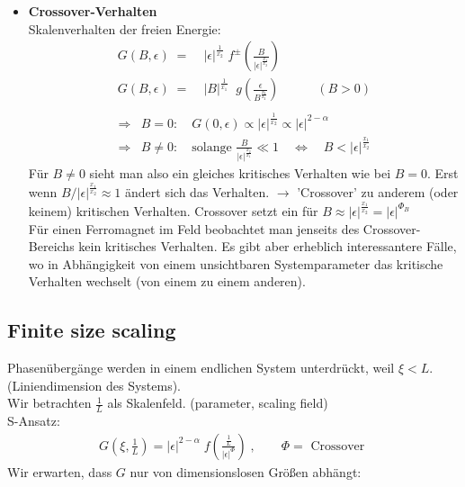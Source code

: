 \documentclass[12pt]{article}
\begin{document}
\begin{itemize}
\item \textbf{Crossover-Verhalten} \\
Skalenverhalten der freien Energie:
\begin{align}
G(B,\epsilon) \; =& \;  \vert \epsilon \vert ^\frac{1}{x_2} \; f^\pm \left( \frac{B}{\vert \epsilon \vert ^\frac{x_1}{x_2}} \right) \\
G(B,\epsilon) \; =  & \; \vert B \vert ^\frac{1}{x_1}\;  \; g \left( \frac{\epsilon}{B ^\frac{x_2}{x_2}} \right) \quad \quad \quad (B>0) \\
\end{align}
\begin{align}
\Rightarrow & B=0: \quad  G(0,\epsilon) \propto \vert \epsilon \vert ^\frac{1}{x_2} \propto \vert \epsilon \vert^{2- \alpha} \\
\Rightarrow & B \neq 0: \quad \mbox{solange } \frac{B}{\vert \epsilon \vert ^\frac{x_2}{x_1}} \ll 1 \quad \Leftrightarrow \quad B< \vert \epsilon \vert ^\frac{x_1}{x_2} \end{align}
Für $B\neq 0$ sieht man also ein gleiches kritisches Verhalten wie bei $ B=0.$ Erst wenn $ B/ \vert \epsilon \vert^\frac{x_1}{x_2} \approx 1 $ ändert sich das Verhalten.  $\to$ 'Crossover' zu anderem (oder keinem) kritischen Verhalten. Crossover setzt ein für $B \approx \vert \epsilon \vert^\frac{x_1}{x_2} = \vert \epsilon \vert ^{\Phi_B}$ \\
Für einen Ferromagnet im Feld beobachtet man jenseits des Crossover-Bereichs kein kritisches Verhalten. Es gibt aber erheblich interessantere Fälle, wo in Abhängigkeit von einem unsichtbaren %
 Systemparameter das kritische Verhalten wechselt (von einem zu einem anderen).
\end{itemize}
\subsection{Finite size scaling}
Phasenübergänge werden in einem endlichen System unterdrückt, weil $ \xi < L$. (Liniendimension %
des Systems). \\
Wir betrachten $\frac{1}{L}$ als Skalenfeld. (parameter, scaling field) \\
S-Ansatz: 
\begin{align}G(\xi, \frac{1}{L}) = \vert \epsilon \vert^{2-\alpha} \; f \left( \frac{\frac{1}{L}}{\vert \epsilon \vert^\Phi}\right) \; , \quad \quad \Phi = \mbox{ Crossover }
\end{align}
Wir erwarten, dass $G$ nur von dimensionslosen Größen abhängt:
\end{document}
